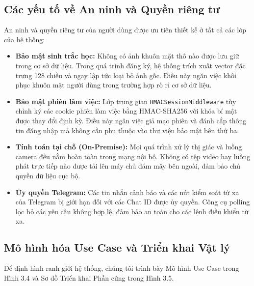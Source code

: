 \documentclass[12pt,a4paper]{article}
\begin{document}
\subsection{Các yếu tố về An ninh và Quyền riêng tư}
An ninh và quyền riêng tư của người dùng được ưu tiên thiết kế ở tất cả các lớp của hệ thống:
\begin{itemize}
    \item \textbf{Bảo mật sinh trắc học:} Không có ảnh khuôn mặt thô nào được lưu giữ trong cơ sở dữ liệu. Trong quá trình đăng ký, hệ thống trích xuất vector đặc trưng 128 chiều và ngay lập tức loại bỏ ảnh gốc. Điều này ngăn việc khôi phục khuôn mặt người dùng trong trường hợp rò rỉ cơ sở dữ liệu.
    \item \textbf{Bảo mật phiên làm việc:} Lớp trung gian \texttt{HMACSessionMiddleware} tùy chỉnh ký các cookie phiên làm việc bằng HMAC-SHA256 với khóa bí mật được thay đổi định kỳ. Điều này ngăn việc giả mạo phiên và đánh cắp thông tin đăng nhập mà không cần phụ thuộc vào thư viện bảo mật bên thứ ba.
    \item \textbf{Tính toán tại chỗ (On-Premise):} Mọi quá trình xử lý thị giác và luồng camera đều nằm hoàn toàn trong mạng nội bộ. Không có tệp video hay luồng phát trực tiếp nào được tải lên máy chủ đám mây bên ngoài, đảm bảo chủ quyền dữ liệu cục bộ.
    \item \textbf{Ủy quyền Telegram:} Các tin nhắn cảnh báo và các nút kiểm soát từ xa của Telegram bị giới hạn đối với các Chat ID được ủy quyền. Công cụ polling lọc bỏ các yêu cầu không hợp lệ, đảm bảo an toàn cho các lệnh điều khiển từ xa.
\end{itemize}

\subsection{Mô hình hóa Use Case và Triển khai Vật lý}
Để định hình ranh giới hệ thống, chúng tôi trình bày Mô hình Use Case trong Hình 3.4 và Sơ đồ Triển khai Phần cứng trong Hình 3.5.
\end{document}
